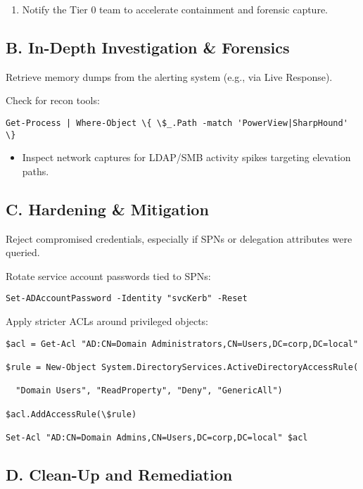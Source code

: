 {{\begin{enumerate}
    \item Notify the Tier 0 team to accelerate containment and forensic capture.
\end{enumerate}

\subsection{B. In-Depth Investigation \& Forensics}

Retrieve memory dumps from the alerting system (e.g., via Live Response).

Check for recon tools:

\begin{verbatim}
Get-Process | Where-Object \{ \$_.Path -match 'PowerView|SharpHound' \}
\end{verbatim}

\begin{itemize}
    \item Inspect network captures for LDAP/SMB activity spikes targeting elevation paths.
\end{itemize}

\subsection{C. Hardening \& Mitigation}

Reject compromised credentials, especially if SPNs or delegation attributes were queried.

Rotate service account passwords tied to SPNs:

\begin{verbatim} 
Set-ADAccountPassword -Identity "svcKerb" -Reset
\end{verbatim}

Apply stricter ACLs around privileged objects:

\begin{verbatim}
$acl = Get-Acl "AD:CN=Domain Administrators,CN=Users,DC=corp,DC=local"

$rule = New-Object System.DirectoryServices.ActiveDirectoryAccessRule(

  "Domain Users", "ReadProperty", "Deny", "GenericAll")

$acl.AddAccessRule(\$rule)

Set-Acl "AD:CN=Domain Admins,CN=Users,DC=corp,DC=local" $acl
\end{verbatim}

\subsection{D. Clean-Up and Remediation}

}}
